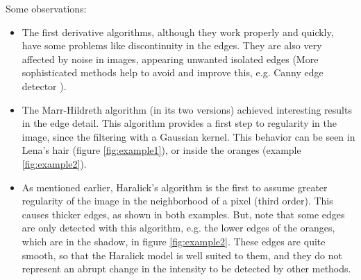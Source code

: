 \documentclass{ipol}
\numberwithin{equation}{section}
\numberwithin{table}{section}
\numberwithin{figure}{section}
\begin{document}
Some observations: 
\begin{itemize}
	\item The first derivative algorithms, although they work properly and quickly, have some problems like discontinuity in the edges. They are also very affected by noise in images, appearing unwanted isolated edges (More sophisticated methods help to avoid and improve this, e.g. Canny edge detector \cite{Canny1986}). \\
	\item The Marr-Hildreth algorithm (in its two versions) achieved interesting results in the edge detail. This algorithm provides a first step to regularity in the image, since the filtering with a Gaussian kernel. This behavior can be seen in Lena's hair (figure \ref{fig:example1}), or inside the oranges (example \ref{fig:example2}). \\
	\item As mentioned earlier, Haralick's algorithm is the first to assume greater regularity of the image in the neighborhood of a pixel (third order). This causes thicker edges, as shown in both examples. But, note that some edges are only detected with this algorithm, e.g. the lower edges of the oranges, which are in the shadow, in figure \ref{fig:example2}. These edges are quite smooth, so that the Haralick model is well suited to them, and they do not represent an abrupt change in the intensity to be detected by other methods. \\
\end{itemize}
\end{document}

